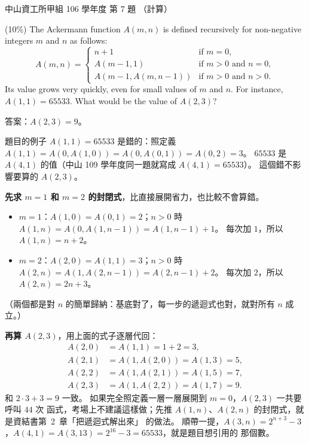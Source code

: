 \begin{pastexam}[label={px:nsysu-106-osds-02}]{中山資工所甲組 106 學年度 第 7 題}
（計算）

(10\%) The Ackermann function $A(m,n)$ is defined recursively for non-negative integers $m$ and
$n$ as follows:
\[
A(m,n)=\begin{cases} n+1 & \text{if } m=0,\\ A(m-1,1) & \text{if } m>0 \text{ and } n=0,\\
A(m-1,A(m,n-1)) & \text{if } m>0 \text{ and } n>0.\end{cases}
\]
Its value grows very quickly, even for small values of $m$ and $n$. For instance, $A(1,1)=65533$.
What would be the value of $A(2,3)$?
\end{pastexam}

\begin{pastsoln}
答案：$A(2, 3) = 9$。

題目的例子 $A(1, 1) = 65533$ 是錯的：照定義 $A(1, 1) = A(0, A(1, 0)) = A(0, A(0, 1)) = A(0, 2) = 3$。
$65533$ 是 $A(4, 1)$ 的值（中山 109 學年度同一題就寫成 $A(4, 1) = 65533$）。 這個錯不影響要算的
$A(2, 3)$。

\textbf{先求 $m = 1$ 和 $m = 2$ 的封閉式}，比直接展開省力，也比較不會算錯。
\begin{itemize}
\item $m = 1$：$A(1, 0) = A(0, 1) = 2$；$n > 0$ 時 $A(1, n) = A(0, A(1, n-1)) = A(1, n-1) + 1$。
每次加 $1$，所以 $A(1, n) = n + 2$。
\item $m = 2$：$A(2, 0) = A(1, 1) = 3$；$n > 0$ 時
$A(2, n) = A(1, A(2, n-1)) = A(2, n-1) + 2$。 每次加 $2$，所以 $A(2, n) = 2n + 3$。
\end{itemize}
（兩個都是對 $n$ 的簡單歸納：基底對了，每一步的遞迴式也對，就對所有 $n$ 成立。）

\textbf{再算 $A(2, 3)$}，用上面的式子逐層代回：
\begin{align*}
A(2, 0) &= A(1, 1) = 1 + 2 = 3,\\
A(2, 1) &= A(1, A(2, 0)) = A(1, 3) = 5,\\
A(2, 2) &= A(1, A(2, 1)) = A(1, 5) = 7,\\
A(2, 3) &= A(1, A(2, 2)) = A(1, 7) = 9.
\end{align*}
和 $2 \cdot 3 + 3 = 9$ 一致。 如果完全照定義一層一層展開到 $m = 0$，$A(2, 3)$ 一共要呼叫 $44$ 次
函式，考場上不建議這樣做；先推 $A(1, n)$、$A(2, n)$ 的封閉式，就是資結書第~2~章「把遞迴式解出來」
的做法。 順帶一提，$A(3, n) = 2^{n+3} - 3$，$A(4, 1) = A(3, 13) = 2^{16} - 3 = 65533$，就是題目想引用的
那個數。
\end{pastsoln}
